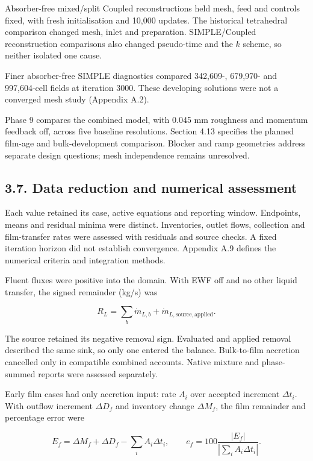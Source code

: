 \documentclass[
  12pt,
  a4paper,
]{article}
\begin{document}
Absorber-free mixed/split Coupled reconstructions held mesh, feed and
controls fixed, with fresh initialisation and 10,000 updates. The
historical tetrahedral comparison changed mesh, inlet and preparation.
SIMPLE/Coupled reconstruction comparisons also changed pseudo-time and
the \(k\) scheme, so neither isolated one cause.

Finer absorber-free SIMPLE diagnostics compared 342,609-, 679,970- and
997,604-cell fields at iteration 3000. These developing solutions were
not a converged mesh study (Appendix A.2).

Phase 9 compares the combined model, with 0.045 mm roughness and
momentum feedback off, across five baseline resolutions. Section 4.13
specifies the planned film-age and bulk-development comparison. Blocker
and ramp geometries address separate design questions; mesh independence
remains unresolved.

\subsection{3.7. Data reduction and numerical
assessment}\label{data-reduction-and-numerical-assessment}

Each value retained its case, active equations and reporting window.
Endpoints, means and residual minima were distinct. Inventories, outlet
flows, collection and film-transfer rates were assessed with residuals
and source checks. A fixed iteration horizon did not establish
convergence. Appendix A.9 defines the numerical criteria and integration
methods.

Fluent fluxes were positive into the domain. With EWF off and no other
liquid transfer, the signed remainder (kg/s) was

\[
R_L=\sum_b\dot m_{L,b}+\dot m_{L,\mathrm{source,applied}}.
\]

The source retained its negative removal sign. Evaluated and applied
removal described the same sink, so only one entered the balance.
Bulk-to-film accretion cancelled only in compatible combined accounts.
Native mixture and phase-summed reports were assessed separately.

Early film cases had only accretion input: rate \(A_i\) over accepted
increment \(\Delta t_i\). With outflow increment \(\Delta D_f\) and
inventory change \(\Delta M_f\), the film remainder and percentage error
were

\[
E_f=\Delta M_f+\Delta D_f-\sum_i A_i\Delta t_i,\qquad
e_f=100\frac{|E_f|}{\left|\sum_i A_i\Delta t_i\right|}.
\]
\end{document}

